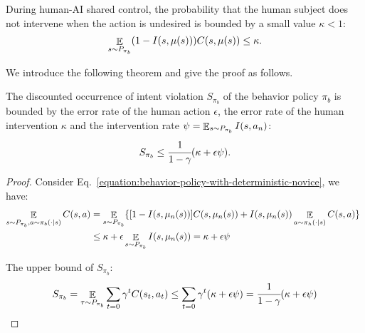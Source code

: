 \begin{assumption}
\label{assumption:intervention-error-rate}
During human-AI shared control, the probability that the human subject does not intervene when the action is undesired is bounded by a small value $\kappa < 1$:
\begin{equation}
\mathop{\mathbb E}_{s \sim P_{\pi_b}}  (1 - I(s, \mu(s))) C(s, \mu(s)) \le \kappa  .
\end{equation}
\end{assumption}


We introduce the following theorem and give the proof as follows.
\begin{theorem}
The discounted occurrence of intent violation ${S_{\pi_b}}$ of the behavior policy ${\pi_b}$ is bounded by the error rate of the human action $\epsilon$, the error rate of the human intervention $\kappa$ and the intervention rate $\psi = \mathop{\mathbb E}_{s\sim P_{\pi_b}} I(s, a_n)$:
\begin{equation}
{S_{\pi_b}}
\le
\cfrac{1}{1 - \gamma}(
\kappa + \epsilon \psi
).
\end{equation}
\end{theorem}



\begin{proof}

Consider Eq.~\ref{equation:behavior-policy-with-deterministic-novice}, we have:
\begin{equation}
\begin{aligned}
\mathop{\mathbb E}_{s \sim P_{\pi_b}, a\sim \pi_b(\cdot|s)} C(s, a) 
& =
\mathop{\mathbb E}_{s \sim P_{\pi_b}}\lbrace [1 - I(s, \mu_n(s))] C(s, \mu_n(s))
+
I(s, \mu_n(s)) \mathop{\mathbb E}_{a\sim \pi_h(\cdot|s)} C(s, a)
\rbrace
~\\
& \le 
\kappa + 
\epsilon
\mathop{\mathbb E}_{s \sim P_{\pi_b}} I(s, \mu_n(s)) 
 = \kappa + 
\epsilon \psi
\end{aligned}
\end{equation}	


The upper bound of $S_{\pi_b}$:
\begin{equation}
\begin{aligned}
S_{\pi_b} = 
\mathop{\mathbb E}_{\tau \sim P_{\pi_b}} \sum_{t=0}\gamma^{t} C(s_{t}, a_{t})
\le 
\sum_{t=0}\gamma^{t}
(
\kappa + \epsilon \psi
)
=
\cfrac{1}{1 - \gamma}(\kappa + \epsilon\psi)
\end{aligned}
\end{equation}	
\end{proof}



